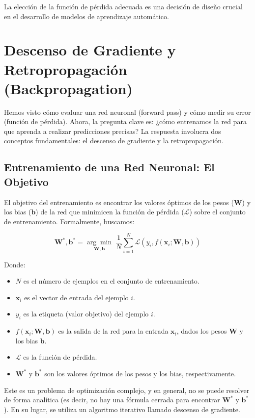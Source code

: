 \documentclass{article}
\begin{document}
La elección de la función de pérdida adecuada es una decisión de diseño crucial en el desarrollo de modelos de aprendizaje automático.

\section{Descenso de Gradiente y Retropropagación (Backpropagation)}

Hemos visto cómo evaluar una red neuronal (forward pass) y cómo medir su error (función de pérdida). Ahora, la pregunta clave es: ¿cómo entrenamos la red para que aprenda a realizar predicciones precisas?  La respuesta involucra dos conceptos fundamentales: el descenso de gradiente y la retropropagación.

\subsection{Entrenamiento de una Red Neuronal: El Objetivo}

El objetivo del entrenamiento es encontrar los valores óptimos de los pesos (\(\mathbf{W}\)) y los bias (\(\mathbf{b}\)) de la red que minimicen la función de pérdida (\(\mathcal{L}\)) sobre el conjunto de entrenamiento. Formalmente, buscamos:

\[
\mathbf{W}^*, \mathbf{b}^* = \underset{\mathbf{W}, \mathbf{b}}{\arg\min} \; \frac{1}{N} \sum_{i=1}^{N} \mathcal{L}(y_i, f(\mathbf{x}_i; \mathbf{W}, \mathbf{b}))
\]

Donde:

\begin{itemize}
    \item \(N\) es el número de ejemplos en el conjunto de entrenamiento.
    \item \(\mathbf{x}_i\) es el vector de entrada del ejemplo \(i\).
    \item \(y_i\) es la etiqueta (valor objetivo) del ejemplo \(i\).
    \item \(f(\mathbf{x}_i; \mathbf{W}, \mathbf{b})\) es la salida de la red para la entrada \(\mathbf{x}_i\), dados los pesos \(\mathbf{W}\) y los bias \(\mathbf{b}\).
    \item \(\mathcal{L}\) es la función de pérdida.
    \item \(\mathbf{W}^*\) y \(\mathbf{b}^*\) son los valores óptimos de los pesos y los bias, respectivamente.
\end{itemize}

Este es un problema de optimización complejo, y en general, no se puede resolver de forma analítica (es decir, no hay una fórmula cerrada para encontrar \(\mathbf{W}^*\) y \(\mathbf{b}^*\)). En su lugar, se utiliza un algoritmo iterativo llamado descenso de gradiente.
\end{document}
